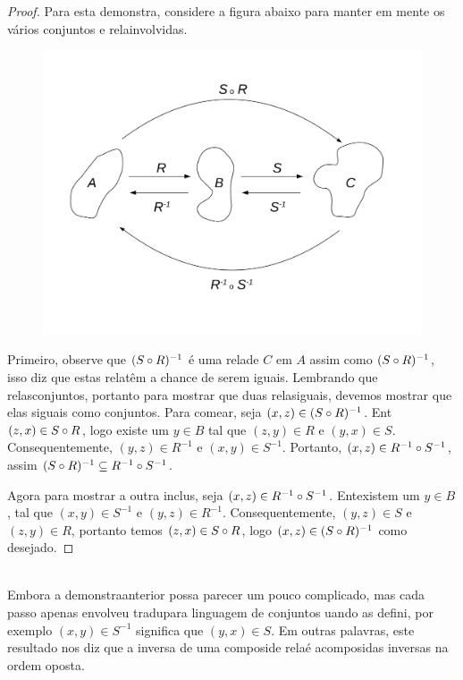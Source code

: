 \begin{proof}
Para esta demonstra\caoi, considere a figura abaixo para manter em mente os v\'arios conjuntos e rela\coes involvidas.
\begin{figure}[h]
\begin{center}
\includegraphics[width=13cm,trim={2cm 2.5cm 2cm 2.5cm},clip]{./figuras/figure22.pdf}
\end{center}
\end{figure}
Primeiro, observe que $(S\circ R)^{-1}$ \'e uma rela\cao de $C$ em $A$ assim como $(S\circ R)^{-1}$, isso diz que estas rela\coes t\^em a chance de serem iguais. Lembrando que rela\coes s\ao conjuntos, portanto para mostrar que duas rela\coes s\ao iguais, devemos mostrar que elas s\ao iguais como conjuntos. Para come\cc ar, seja $(x,z)\in (S\circ R)^{-1}$. Ent\ao $(z,x)\in S\circ R$, logo existe um $y\in B$ tal que $(z,y)\in R$ e $(y,x)\in S$. Consequentemente, $(y,z)\in R^{-1}$ e $(x,y)\in S^{-1}$. Portanto, $(x,z)\in R^{-1}\circ S^{-1}$, assim $(S\circ R)^{-1}\subseteq R^{-1}\circ S^{-1}$.

Agora para mostrar a outra inclus\ao, seja $(x,z)\in R^{-1}\circ S^{-1}$. Ent\ao existem um $y\in B$, tal que $(x,y)\in S^{-1}$ e $(y,z)\in R^{-1}$. Consequentemente, $(y,z)\in S$ e $(z,y)\in R$, portanto temos $(z,x)\in S\circ R$, logo $(x,z)\in (S\circ R)^{-1}$ como desejado.
\end{proof}
\\

Embora a demonstra\cao anterior possa parecer um pouco complicado, mas cada passo apenas envolveu tradu\cao para linguagem de conjuntos uando as defini\cois, por exemplo $(x,y)\in S^{-1}$ significa que $(y,x)\in S$. Em outras palavras, este resultado nos diz que a inversa de uma composi\cao de rela\coes \'e acomposi\cao das inversas na ordem oposta.

